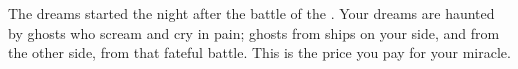 \documentclass[char]{TMFHope}
\begin{document}
The dreams started the night after the battle of the \pOld{}. Your dreams are haunted by ghosts who scream and cry in pain; ghosts from ships on your side, and from the other side, from that fateful battle. This is the price you pay for your miracle.	

\begin{itemz}[Goals]
	\item 
\end{itemz}

\begin{itemz}[Notes]
	\item 
\end{itemz}

\begin{contacts}
	\contact{\cXO{}}
	\contact{\cDip{}}
	\contact{\cMed{}}
	\contact{\cSci{}}
	
	\contact{\cEng{}}
	\contact{\cWeap{}}
	\contact{\cNav{}}
	\contact{\cBoy{}}
\end{contacts}
\end{document}
